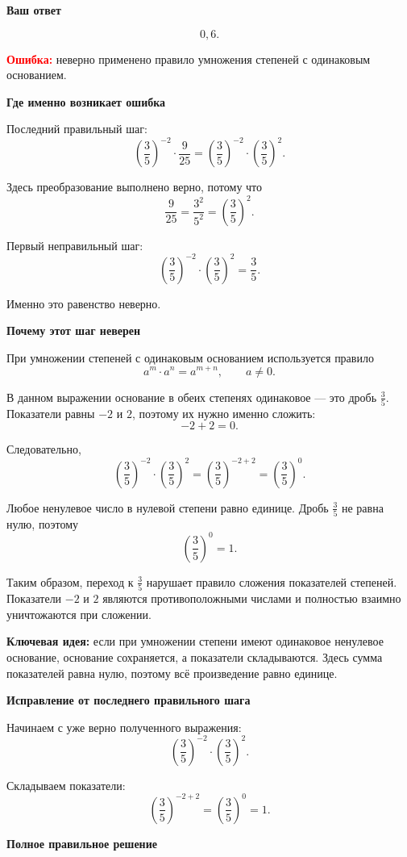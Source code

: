 \documentclass[12pt,a4paper]{article}
\begin{document}
\textbf{Ваш ответ}

\[
0{,}6.
\]

\textcolor{red}{\textbf{Ошибка:}} неверно применено правило умножения степеней с одинаковым основанием.

\textbf{Где именно возникает ошибка}

Последний правильный шаг:
\[
\left(\frac{3}{5}\right)^{-2}\cdot\frac{9}{25}
=
\left(\frac{3}{5}\right)^{-2}\cdot\left(\frac{3}{5}\right)^2.
\]

Здесь преобразование выполнено верно, потому что
\[
\frac{9}{25}=\frac{3^2}{5^2}=\left(\frac{3}{5}\right)^2.
\]

Первый неправильный шаг:
\[
\left(\frac{3}{5}\right)^{-2}\cdot\left(\frac{3}{5}\right)^2
=\frac{3}{5}.
\]

Именно это равенство неверно.

\textbf{Почему этот шаг неверен}

При умножении степеней с одинаковым основанием используется правило
\[
a^m\cdot a^n=a^{m+n},\qquad a\ne 0.
\]

В данном выражении основание в обеих степенях одинаковое --- это дробь $\frac{3}{5}$. Показатели равны $-2$ и $2$, поэтому их нужно именно сложить:
\[
-2+2=0.
\]

Следовательно,
\[
\left(\frac{3}{5}\right)^{-2}\cdot\left(\frac{3}{5}\right)^2
=
\left(\frac{3}{5}\right)^{-2+2}
=
\left(\frac{3}{5}\right)^0.
\]

Любое ненулевое число в нулевой степени равно единице. Дробь $\frac{3}{5}$ не равна нулю, поэтому
\[
\left(\frac{3}{5}\right)^0=1.
\]

Таким образом, переход к $\frac{3}{5}$ нарушает правило сложения показателей степеней. Показатели $-2$ и $2$ являются противоположными числами и полностью взаимно уничтожаются при сложении.

\textcolor{blue!60!black}{\textbf{Ключевая идея:}} если при умножении степени имеют одинаковое ненулевое основание, основание сохраняется, а показатели складываются. Здесь сумма показателей равна нулю, поэтому всё произведение равно единице.

\textbf{Исправление от последнего правильного шага}

Начинаем с уже верно полученного выражения:
\[
\left(\frac{3}{5}\right)^{-2}\cdot\left(\frac{3}{5}\right)^2.
\]

Складываем показатели:
\[
\left(\frac{3}{5}\right)^{-2+2}
=
\left(\frac{3}{5}\right)^0
=1.
\]

\textbf{Полное правильное решение}
\end{document}
